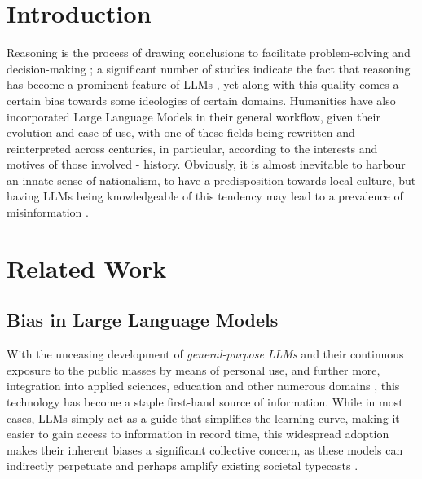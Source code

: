 \documentclass[11pt]{article}
\begin{document}
\section{Introduction}
Reasoning is the process of drawing conclusions to facilitate problem-solving and decision-making \cite{leighton2003}; a significant number of studies indicate the fact that reasoning has become a prominent feature of LLMs \cite{chandra2025}, yet along with this quality comes a certain bias towards some ideologies of certain domains.
Humanities have also incorporated Large Language Models in their general workflow, given their evolution and ease of use, with one of these fields being rewritten and reinterpreted across centuries, in particular, according to the interests and motives of those involved - history. Obviously, it is almost inevitable to harbour an innate sense of nationalism, to have a predisposition towards local culture, but having LLMs being knowledgeable of this tendency may lead to a prevalence of misinformation \cite{cichocka2020}. 


\section{Related Work}
\subsection{Bias in Large Language Models}
With the unceasing development of \textit{general-purpose LLMs} and their continuous exposure to the public masses by means of personal use, and further more, integration into applied sciences, education and other numerous domains \cite{guo2024}, this technology has become a staple first-hand source of information. While in most cases, LLMs simply act as a guide that simplifies the learning curve, making it easier to gain access to information in record time, this widespread adoption makes their inherent biases a significant collective concern, as these models can indirectly perpetuate and perhaps amplify existing societal typecasts \cite{kumar2024}.
\end{document}
